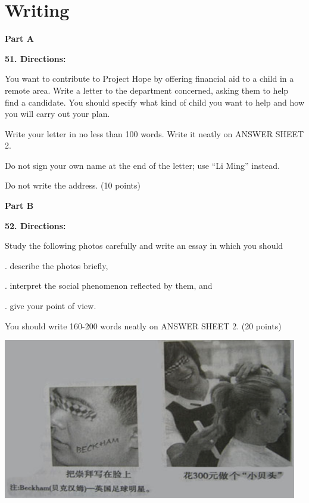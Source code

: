 
\section{Writing}
\textbf{Part A}

\textbf{51. Directions:}

\qquad You want to contribute to Project Hope by offering financial aid to a child in a remote area. Write a letter to the department concerned, asking them to help find a candidate. You should specify what kind of child you want to help and how you will carry out your plan.

\qquad Write your letter in no less than 100 words. Write it neatly on ANSWER SHEET 2.

\qquad Do not sign your own name at the end of the letter; use “Li Ming” instead.

\qquad Do not write the address. (10 points)

\vspace{10pt}

\textbf{Part B}

\textbf{52. Directions:}

\qquad Study the following photos carefully and write an essay in which you should

. describe the photos briefly,

. interpret the social phenomenon reflected by them, and

. give your point of view.

\qquad You should write 160-200 words neatly on ANSWER SHEET 2. (20 points)

\begin{center}\includegraphics[height=7cm]{8.png}\end{center}